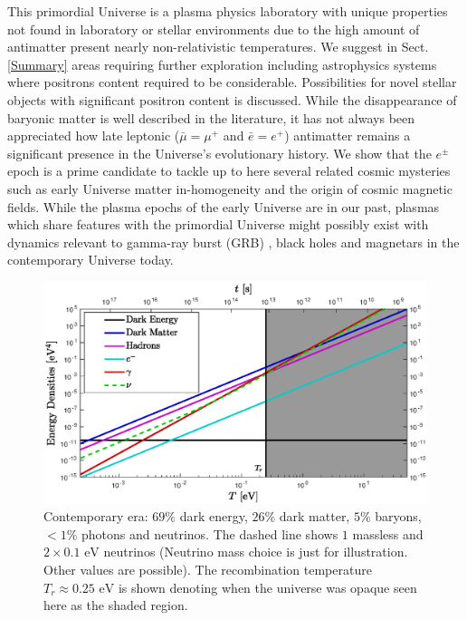 \documentclass[universe,article,submit,moreauthors,pdftex,a4paper]{Definitions/mdpi}
\newcommand{\eV}{\text{ eV}}
\newcommand*{\rsec}[1]{Sect.\,{\ref{#1}}}
\begin{document}
This primordial Universe is a plasma physics laboratory with unique properties not found in laboratory or stellar environments due to the high amount of antimatter present nearly non-relativistic temperatures. We suggest in \rsec{Summary} areas requiring further exploration including astrophysics systems where positrons content required to be considerable. Possibilities for novel stellar objects with significant positron content is discussed. While the disappearance of baryonic matter is well described in the literature, it has not always been appreciated how late leptonic ($\bar{\mu}=\mu^{+}$ and $\bar{e}=e^{+}$) antimatter remains a significant presence in the Universe's evolutionary history. We show that the $e^{\pm}$ epoch is a prime candidate to tackle up to here several related cosmic mysteries such as early Universe matter in-homogeneity and the origin of cosmic magnetic fields. While the plasma epochs of the early Universe are in our past, plasmas which share features with the primordial Universe might possibly exist with dynamics relevant to gamma-ray burst (GRB) \cite{Ruffini:2001fe,Aksenov:2008ze,Ruffini:2012it,Han:2011er}, black holes \cite{Ruffini:2009hg,Ruffini:2000yu} and magnetars \cite{Duncan:1992hi,Belvedere:2012uc} in the contemporary Universe today.
\begin{figure}
  \centerline{\includegraphics[width=\textwidth]{./plots/energy_densities_new.eps}}
  \caption{Contemporary era: $69\%$ dark energy, $26\%$ dark matter, $5\%$ baryons, $<1\%$ photons and neutrinos.  The dashed line shows $1$ massless and $2\times 0.1\eV$ neutrinos (Neutrino mass choice is just for illustration.  Other values are possible). The recombination temperature $T_{r}\approx0.25\eV$ is shown denoting when the universe was opaque seen here as the shaded region. \label{CosmicDensity}}
\end{figure}
\end{document}
